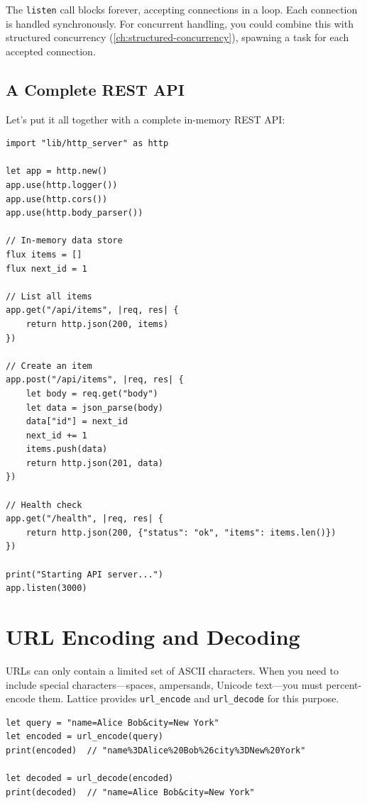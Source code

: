 The \lstinline|listen| call blocks forever, accepting connections in a loop.
Each connection is handled synchronously. For concurrent handling, you could
combine this with structured concurrency (\cref{ch:structured-concurrency}),
spawning a task for each accepted connection.

\subsection{A Complete REST API}\label{sec:rest-api}

Let's put it all together with a complete in-memory REST API:

\begin{lstlisting}[language=Lattice, caption={A complete REST API server}]
import "lib/http_server" as http

let app = http.new()
app.use(http.logger())
app.use(http.cors())
app.use(http.body_parser())

// In-memory data store
flux items = []
flux next_id = 1

// List all items
app.get("/api/items", |req, res| {
    return http.json(200, items)
})

// Create an item
app.post("/api/items", |req, res| {
    let body = req.get("body")
    let data = json_parse(body)
    data["id"] = next_id
    next_id += 1
    items.push(data)
    return http.json(201, data)
})

// Health check
app.get("/health", |req, res| {
    return http.json(200, {"status": "ok", "items": items.len()})
})

print("Starting API server...")
app.listen(3000)
\end{lstlisting}

\section{URL Encoding and Decoding}\label{sec:url-encoding}


URLs can only contain a limited set of ASCII characters. When you need to
include special characters---spaces, ampersands, Unicode text---you must
percent-encode them. Lattice provides \lstinline|url_encode| and
\lstinline|url_decode| for this purpose.

\begin{lstlisting}[language=Lattice, caption={URL encoding and decoding}]
let query = "name=Alice Bob&city=New York"
let encoded = url_encode(query)
print(encoded)  // "name%3DAlice%20Bob%26city%3DNew%20York"

let decoded = url_decode(encoded)
print(decoded)  // "name=Alice Bob&city=New York"
\end{lstlisting}

